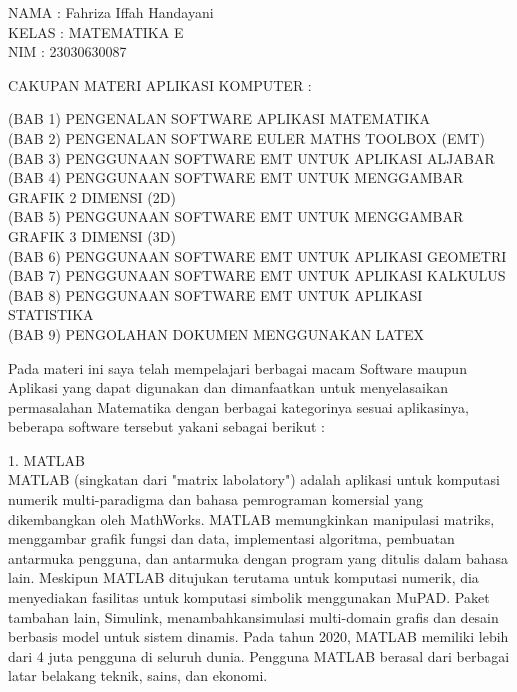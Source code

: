 \documentclass[a4paper,10pt]{article}
\begin{document}
\begin{eulernotebook}
\eulersubheading{}
\eulersubheading{}
\begin{eulercomment}
NAMA : Fahriza Iffah Handayani\\
KELAS : MATEMATIKA E\\
NIM   : 23030630087

\end{eulercomment}
\eulersubheading{}
\begin{eulercomment}
CAKUPAN MATERI APLIKASI KOMPUTER :

(BAB 1) PENGENALAN SOFTWARE APLIKASI MATEMATIKA\\
(BAB 2) PENGENALAN SOFTWARE EULER MATHS TOOLBOX (EMT)\\
(BAB 3) PENGGUNAAN SOFTWARE EMT UNTUK APLIKASI ALJABAR\\
(BAB 4) PENGGUNAAN SOFTWARE EMT UNTUK MENGGAMBAR GRAFIK 2 DIMENSI (2D)\\
(BAB 5) PENGGUNAAN SOFTWARE EMT UNTUK MENGGAMBAR GRAFIK 3 DIMENSI (3D)\\
(BAB 6) PENGGUNAAN SOFTWARE EMT UNTUK APLIKASI GEOMETRI\\
(BAB 7) PENGGUNAAN SOFTWARE EMT UNTUK APLIKASI KALKULUS\\
(BAB 8) PENGGUNAAN SOFTWARE EMT UNTUK APLIKASI STATISTIKA\\
(BAB 9) PENGOLAHAN DOKUMEN MENGGUNAKAN LATEX

\end{eulercomment}
\eulersubheading{}
\begin{eulercomment}
Pada materi ini saya telah mempelajari berbagai macam Software maupun Aplikasi
yang dapat digunakan dan dimanfaatkan untuk menyelasaikan permasalahan
Matematika dengan berbagai kategorinya sesuai aplikasinya, beberapa software
tersebut yakani sebagai berikut :

1. MATLAB\\
MATLAB (singkatan dari "matrix labolatory") adalah aplikasi untuk komputasi
numerik multi-paradigma dan bahasa pemrograman komersial yang dikembangkan
oleh MathWorks. MATLAB memungkinkan manipulasi matriks, menggambar grafik
fungsi dan data, implementasi algoritma, pembuatan antarmuka pengguna, dan
antarmuka dengan program yang ditulis dalam bahasa lain. Meskipun MATLAB
ditujukan terutama untuk komputasi numerik, dia menyediakan fasilitas untuk
komputasi simbolik menggunakan MuPAD. Paket tambahan lain, Simulink,
menambahkansimulasi multi-domain grafis dan desain berbasis model untuk sistem
dinamis. Pada tahun 2020, MATLAB memiliki lebih dari 4 juta pengguna di
seluruh dunia. Pengguna MATLAB berasal dari berbagai latar belakang teknik,
sains, dan ekonomi. 


\end{eulercomment}
\end{eulernotebook}
\end{document}

